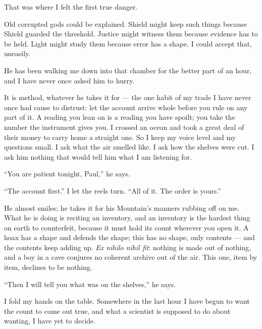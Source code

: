 That was where I felt the first true danger.\par

Old corrupted gods could be explained. Shield might keep such things because Shield guarded the threshold. Justice might witness them because evidence has to be held. Light might study them because error has a shape. I could accept that, uneasily.\par

\ornament

He has been walking me down into that chamber for the better part of an hour, and I have never once asked him to hurry.\par

It is method, whatever he takes it for --- the one habit of my trade I have never once had cause to distrust: let the account arrive whole before you rule on any part of it. A reading you lean on is a reading you have spoilt; you take the number the instrument gives you. I crossed an ocean and took a great deal of their money to carry home a straight one. So I keep my voice level and my questions small. I ask what the air smelled like. I ask how the shelves were cut. I ask him nothing that would tell him what I am listening for.\par

``You are patient tonight, Paul,'' he says.\par

``The account first.'' I let the reels turn. ``All of it. The order is yours.''\par

He almost smiles; he takes it for his Mountain's manners rubbing off on me. What he is doing is reciting an inventory, and an inventory is the hardest thing on earth to counterfeit, because it must hold its count wherever you open it. A hoax has a shape and defends the shape; this has no shape, only contents --- and the contents keep adding up. \textit{Ex nihilo nihil fit}: nothing is made out of nothing, and a boy in a cave conjures no coherent archive out of the air. This one, item by item, declines to be nothing.\par

``Then I will tell you what was on the shelves,'' he says.\par

I fold my hands on the table. Somewhere in the last hour I have begun to want the count to come out true, and what a scientist is supposed to do about wanting, I have yet to decide.\par


